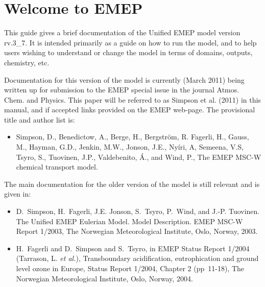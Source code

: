 
\chapter{Welcome to EMEP }

This guide gives a brief documentation of the Unified EMEP model
version rv.3\_7.
It is intended primarily as a guide on how to run the model, and
to help users wishing to understand or change 
the model in terms of domains, outputs, chemistry, etc.


Documentation for this version of the model is currently (March 2011)
being written up for submission to the EMEP special issue
in the journal Atmos. Chem. and Physics. This paper
will be referred to as Simpson et al. (2011) in
this manual, and if accepted links provided on the EMEP web-page. 
The provisional title and author list is:

\begin{itemize}
\item
Simpson, D., Benedictow, A., Berge, H., Bergstr\"om, R.  Fagerli, H., Gauss, M., Hayman, G.D., Jenkin, M.W., Jonson, J.E., Ny\'iri, A, Semeena, V.S, Tsyro, S., Tuovinen, J.P., Valdebenito, \'A., and Wind, P.,
The EMEP  MSC-W chemical transport model.
\end{itemize}



The main documentation for the older version of the model is still relevant and is given in:

\begin{itemize}
\item
D.~Simpson, H.~Fagerli, J.E. Jonson, S.~Tsyro, P.~Wind, and J.-P. Tuovinen.
{The Unified EMEP Eulerian Model. Model Description}.
EMEP MSC-W Report 1/2003, The Norwegian
Meteorological Institute, Oslo, Norway, 2003.
\item
H.~Fagerli and D.~Simpson and S.~Tsyro,
        in EMEP Status Report 1/2004 (Tarrason, L. {\sl et al.}), Transboundary acidification, eutrophication
        and ground level ozone in Europe, Status Report 1/2004, Chapter 2 (pp~11-18), The
        Norwegian Meteorological Institute, Oslo, Norway, 2004. 

\end{itemize}

